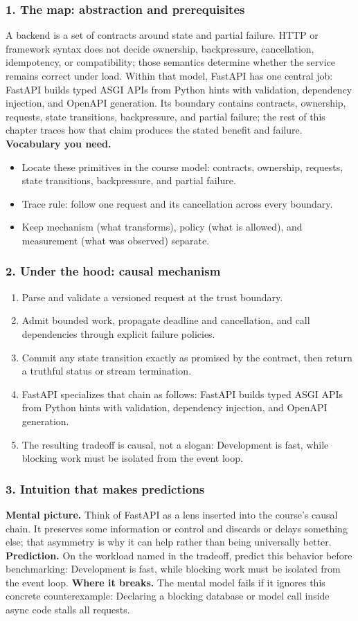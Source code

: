 \subsubsection*{1. The map: abstraction and prerequisites}
A backend is a set of contracts around state and partial failure. HTTP or framework syntax does not decide ownership, backpressure, cancellation, idempotency, or compatibility; those semantics determine whether the service remains correct under load.
Within that model, FastAPI has one central job: FastAPI builds typed ASGI APIs from Python hints with validation, dependency injection, and OpenAPI generation. Its boundary contains contracts, ownership, requests, state transitions, backpressure, and partial failure; the rest of this chapter traces how that claim produces the stated benefit and failure.
\textbf{Vocabulary you need.}\begin{itemize}
\item Locate these primitives in the course model: contracts, ownership, requests, state transitions, backpressure, and partial failure.
\item Trace rule: follow one request and its cancellation across every boundary.
\item Keep mechanism (what transforms), policy (what is allowed), and measurement (what was observed) separate.
\end{itemize}
\subsubsection*{2. Under the hood: causal mechanism}\begin{enumerate}
\item Parse and validate a versioned request at the trust boundary.
\item Admit bounded work, propagate deadline and cancellation, and call dependencies through explicit failure policies.
\item Commit any state transition exactly as promised by the contract, then return a truthful status or stream termination.
\item FastAPI specializes that chain as follows: FastAPI builds typed ASGI APIs from Python hints with validation, dependency injection, and OpenAPI generation.
\item The resulting tradeoff is causal, not a slogan: Development is fast, while blocking work must be isolated from the event loop.
\end{enumerate}
\subsubsection*{3. Intuition that makes predictions}
\textbf{Mental picture.} Think of FastAPI as a lens inserted into the course's causal chain. It preserves some information or control and discards or delays something else; that asymmetry is why it can help rather than being universally better.
\textbf{Prediction.} On the workload named in the tradeoff, predict this behavior before benchmarking: Development is fast, while blocking work must be isolated from the event loop.
\textbf{Where it breaks.} The mental model fails if it ignores this concrete counterexample: Declaring a blocking database or model call inside async code stalls all requests.
